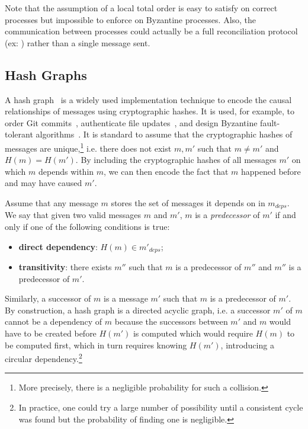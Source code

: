 \documentclass[9pt, oneside]{article}   	%
\begin{document}
Note that the assumption of a local total order is easy to satisfy on correct processes but impossible to enforce on Byzantine processes. Also, the communication between processes could actually be a full reconciliation protocol (ex: \cite{kleppmann2020bec}) rather than a single message sent. 

\subsection{Hash Graphs}
\label{sec:background:hash-graph}

A hash graph~\cite{jacob2022bft-crdt,Kleppmann2022byzantine} is a widely used implementation technique to encode the causal relationships of messages using cryptographic hashes. It is used, for example, to order Git commits~\cite{git-commit}, authenticate file updates~\cite{mahajan2011depot}, and design Byzantine fault-tolerant algorithms~\cite{maniatis2002secure-timeline-entanglement, cachin2011introduction,kleppmann2020bec, Kleppmann2022byzantine}. It is standard to assume that the cryptographic hashes of messages are unique,\footnote{More precisely, there is a negligible probability for such a collision.} i.e. there does not exist $m, m'$ such that $m \neq m'$ and $H(m) = H(m')$. By including the cryptographic hashes of all messages $m'$ on which $m$ depends within $m$, we can then encode the fact that $m$ happened before and may have caused $m'$. 

Assume that any message $m$ stores the set of messages it depends on in $m_\textit{deps}$. We say that given two valid messages $m$ and $m'$, $m$ is a \textit{predecessor} of $m'$ if and only if one of the following conditions is true:
\begin{itemize}
	\item \textbf{direct dependency}: $H(m) \in m'_\textit{deps}$;
	\item \textbf{transitivity}: there exists $m''$ such that $m$ is a predecessor of $m''$ and $m''$ is a predecessor of $m'$.
\end{itemize}

Similarly, a successor of $m$ is a message $m'$ such that $m$ is a predecessor of $m'$. By construction, a hash graph is a directed acyclic graph, i.e. a successor $m'$ of $m$ cannot be a dependency of $m$ because the successors between $m'$ and $m$ would have to be created before $H(m')$ is computed which would require $H(m)$ to be computed first, which in turn requires knowing $H(m')$, introducing a circular dependency.\footnote{In practice, one could try a large number of possibility until a consistent cycle was found but the probability of finding one is negligible.}
\end{document}
